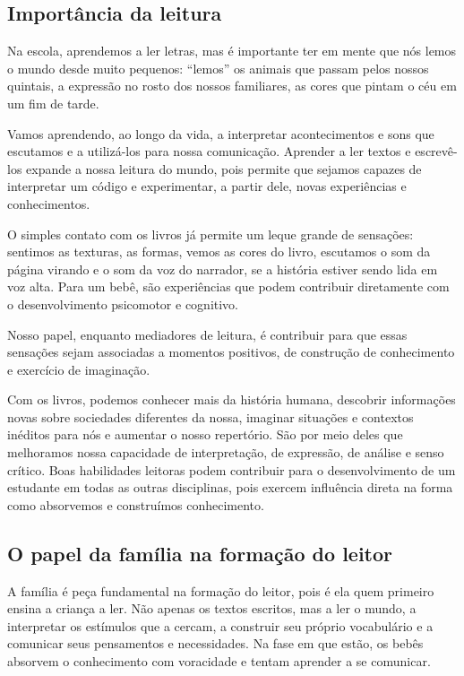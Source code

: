 \documentclass[11pt]{extarticle}
\begin{document}
\subsection{Importância da leitura}
Na escola, aprendemos a ler letras, mas é importante ter em mente que nós 
lemos o mundo desde muito pequenos: “lemos” os animais que passam pelos nossos 
quintais, a expressão no rosto dos nossos familiares, as cores que pintam o céu 
em um fim de tarde. 

Vamos aprendendo, ao longo da vida, a interpretar acontecimentos 
e sons que escutamos e a utilizá-los para nossa comunicação. Aprender a ler textos e 
escrevê-los expande a nossa leitura do mundo, pois permite que sejamos capazes de 
interpretar um código e experimentar, a partir dele, novas experiências e conhecimentos. 

O simples contato com os livros já permite um leque grande de sensações: 
sentimos as texturas, as formas, vemos as cores do livro, escutamos o som da página 
virando e o som da voz do narrador, se a história estiver sendo lida em voz alta. Para um 
bebê, são experiências que podem contribuir diretamente com o desenvolvimento psicomotor 
e cognitivo. 

Nosso papel, enquanto mediadores de leitura, é contribuir para que essas 
sensações sejam associadas a momentos positivos, de construção de 
conhecimento e exercício de imaginação. 

Com os livros, podemos conhecer mais da história humana, descobrir informações 
novas sobre sociedades diferentes da nossa, imaginar situações e contextos inéditos 
para nós e aumentar o nosso repertório. São por meio deles que melhoramos nossa 
capacidade de interpretação, de expressão, de análise e senso crítico. Boas habilidades 
leitoras podem contribuir para o desenvolvimento de um estudante em todas as outras 
disciplinas, pois exercem influência direta na forma como absorvemos e 
construímos conhecimento.


\subsection{O papel da família na formação do leitor}
A família é peça fundamental na formação do leitor, pois é ela quem primeiro 
ensina a criança a ler. Não apenas os textos escritos, mas a ler o mundo, a 
interpretar os estímulos que a cercam, a construir seu próprio vocabulário e a 
comunicar seus pensamentos e necessidades. Na fase em que estão, os bebês 
absorvem o conhecimento com voracidade e tentam aprender a se comunicar. 
\end{document}

